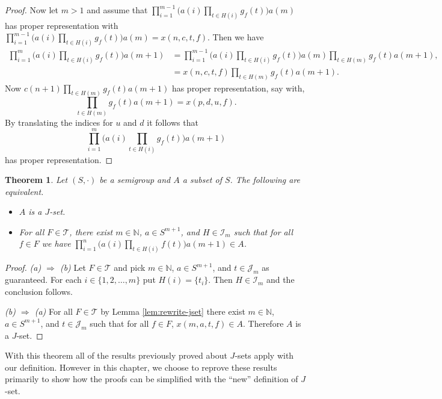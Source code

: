 \documentclass[12pt,showtrims]{memoir}
\theoremstyle{plain}
\newtheorem{thm}{Theorem}[section]
\theoremstyle{definition}
\newcommand{\bbN}{\mathbb{N}}
\newcommand{\calI}{\mathcal{I}}
\newcommand{\calJ}{\mathcal{J}}
\newcommand{\calT}{\mathcal{T}}
\begin{document}
\begin{proof}
  Now let $m > 1$ and assume that $\prod_{i=1}^{m-1} \bigl( a(i) \prod_{t \in H(i)} g_f(t) \bigr) a(m)$ has proper representation with $\prod_{i=1}^{m-1} \bigl( a(i) \prod_{t \in H(i)} g_f(t) \bigr) a(m) = x(n, c, t, f)$. 
  Then we have 
  \begin{align*}
    \textstyle
    \prod_{i=1}^{m} \bigl( a(i) \prod_{t \in H(i)} g_f(t) \bigr) a(m+1) &= \textstyle
    \prod_{i=1}^{m-1} \bigl( a(i) \prod_{t \in H(i)} g_f(t) \bigr) a(m) \prod_{t \in H(m)} g_f(t) a(m+1), \\
    &= \textstyle 
    x(n, c, t, f) \prod_{t \in H(m)} g_f(t) a(m+1).
  \end{align*}
  Now $c(n+1) \prod_{t \in H(m)} g_f(t) a(m+1)$ has proper representation, say with, 
  \[
    \textstyle
    \prod_{t \in H(m)} g_f(t) a(m+1) = x(p, d, u, f).
  \]
  By translating the indices for $u$ and $d$ it follows that 
  \[
    \textstyle
    \prod_{i=1}^{m} \bigl( a(i) \prod_{t \in H(i)} g_f(t) \bigr) a(m+1)
  \]
  has proper representation.
\end{proof}

\begin{thm}
  Let $(S, \cdot)$ be a semigroup and $A$ a subset of $S$.
  The following are equivalent. 
  \begin{itemize}
    \item[(a)] $A$ is a $J$-set.
    \item[(b)] For all $F \in \calT$, there exist $m \in \bbN$, $a \in S^{m+1}$, and $H \in \calI_m$ such that for all $f \in F$ we have $\prod_{i=1}^n\bigl( a(i) \prod_{t \in H(i)} f(t) \bigr) a(m+1) \in A$.
  \end{itemize}
\end{thm}
\begin{proof}
  \textsl{(a) $\Rightarrow$ (b)}
  Let $F \in \calT$ and pick $m \in \bbN$, $a \in S^{m+1}$, and $t \in \calJ_m$ as guaranteed. 
  For each $i \in \{1, 2, \ldots, m\}$ put $H(i) = \{ t_i\}$. 
  Then $H \in \calI_m$ and the conclusion follows. 

  \textsl{(b) $\Rightarrow$ (a)}
  For all $F \in \calT$ by Lemma \ref{lem:rewrite-jset} there exist $m \in \bbN$, $a \in S^{m+1}$, and $t \in \calJ_m$ such that for all $f \in F$, $x(m, a, t, f) \in A$.
  Therefore $A$ is a $J$-set.
\end{proof}

With this theorem all of the results previously proved about $J$-sets apply  with our definition.
However in this chapter, we choose to reprove these results primarily to show how the proofs can be simplified with the ``new'' definition of $J$-set.
\end{document}

